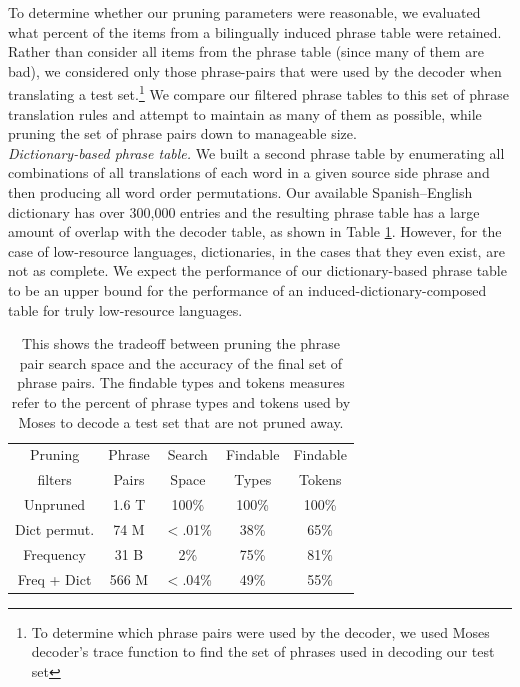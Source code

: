 \documentclass[11pt]{article}
\newcommand{\mnote}[1]{\marginpar{%
  \vskip-\baselineskip
  \raggedright\footnotesize
  \itshape\hrule\smallskip\tiny{#1}\par\smallskip\hrule}}
\newcommand{\mtodo}[1]{\mnote{\textcolor{red}{#1}}}
\begin{document}
To determine whether our pruning parameters were reasonable, we evaluated what percent of the items from a bilingually induced phrase table were retained.  Rather than consider all items from the phrase table (since many of them are bad), we considered only those phrase-pairs that were used by the decoder when translating a test set.\footnote{To determine which phrase pairs were used by the decoder, we used Moses decoder's trace function to find the set of phrases used in decoding our test set} We compare our filtered phrase tables to this set of phrase translation rules and attempt to maintain as many of them as possible, while pruning the set of phrase pairs down to manageable size. \\

\noindent\emph{Dictionary-based phrase table.}\mtodo{Chris had a citation for this method} We built a second phrase table by enumerating all combinations of all translations of each word in a given source side phrase and then producing all word order permutations. Our available \mtodo{citation from this? it's a combination of some of David's dictionaries, I think} Spanish--English dictionary has over 300,000 entries and the resulting phrase table has a large amount of overlap with the decoder table, as shown in Table \ref{table:prune}. However, for the case of low-resource languages, dictionaries, in the cases that they even exist, are not as complete. We expect the performance of our dictionary-based phrase table to be an upper bound for the performance of an induced-dictionary-composed table for truly low-resource languages. 


\begin{table}
\small
\begin{center}
\begin{tabular}{|c|c|c|c|c|}
\hline
Pruning 	& Phrase	& Search & 	Findable 	& Findable \\
filters	& Pairs	&  Space & Types 	&  Tokens \\
\hline
Unpruned & 1.6 T & 100\% & 100\% & 100\% \\
Dict permut. & 74 M & $<$.01\% & 38\% & 65\% \\
Frequency &  31 B & 2\% & 75\% & 81\% \\
Freq + Dict & 566 M & $<$.04\% & 49\% & 55\% \\
\hline
\end{tabular}
\caption{This shows the tradeoff between pruning the phrase pair search space and the accuracy of the final set of phrase pairs. The findable types and tokens measures refer to the percent of phrase types and tokens used by Moses to decode a test set that are not pruned away. }\label{table:prune}
\end{center}
\end{table}
\end{document}
